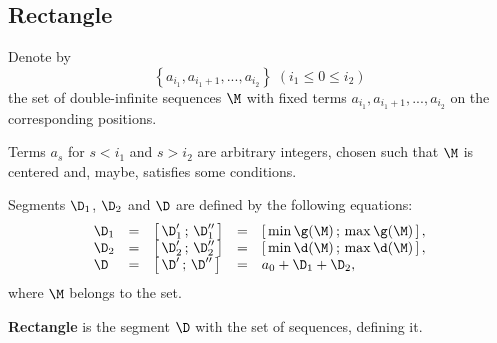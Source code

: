 \subsection{Rectangle}

\begin{designation}
	Denote by
	\begin{equation*}%
		\left\{ a_{i_1}, a_{i_1 + 1}, ..., a_{i_2} \right\}
		\;(i_1 \leqslant 0 \leqslant i_2)
	\end{equation*}
	the set of double-infinite sequences $\M$
	with fixed terms $a_{i_1}, a_{i_1 + 1}, ..., a_{i_2}$
	on the corresponding positions.
	
	Terms $a_s$ for $s < i_1$ and $s > i_2$ are arbitrary integers,
	chosen such that $\M$ is centered and, maybe, satisfies some conditions.
\end{designation}

Segments $\D_1$, $\D_2$ and $\D$
are defined by the following equations:
\begin{equation}\label{deltas}
	\begin{array}{lclcl}
		\D_1 & = & \left[\, \D_1' \,;\, \D_1'' \, \right]
		& = & \left[\, \min\g( \M) \,;\,
		\max\g( \M) \, \right],
		\\
		\D_2 & = & \left[\, \D_2' \,;\, \D_2'' \, \right]
		& = & \left[\, \min\d( \M) \,;\,
		\max\d(\M) \, \right],
		\\
		\D & = & \left[\, \D' \,;\, \D'' \, \right]
		& = & a_0 + \D_1 + \D_2,
	\end{array}
\end{equation}
where $\M$ belongs to the set.

\begin{definition}
	\textbf{Rectangle} is the segment $\D$ with the set of sequences, defining it.
\end{definition}
